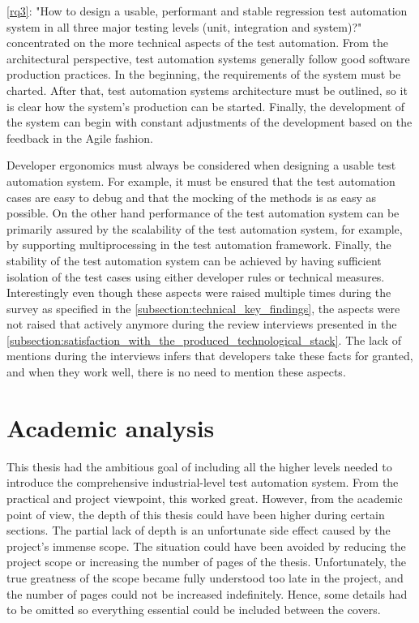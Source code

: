 \autoref{rq3}: "How to design a usable, performant and stable regression test automation system in all three major testing levels (unit, integration and system)?" concentrated on the more technical aspects of the test automation. From the architectural perspective, test automation systems generally follow good software production practices. In the beginning, the requirements of the system must be charted. After that, test automation systems architecture must be outlined, so it is clear how the system's production can be started. Finally, the development of the system can begin with constant adjustments of the development based on the feedback in the Agile fashion.

Developer ergonomics must always be considered when designing a usable test automation system. For example, it must be ensured that the test automation cases are easy to debug and that the mocking of the methods is as easy as possible. On the other hand performance of the test automation system can be primarily assured by the scalability of the test automation system, for example, by supporting multiprocessing in the test automation framework. Finally, the stability of the test automation system can be achieved by having sufficient isolation of the test cases using either developer rules or technical measures. Interestingly even though these aspects were raised multiple times during the survey as specified in the \autoref{subsection:technical_key_findings}, the aspects were not raised that actively anymore during the review interviews presented in the \autoref{subsection:satisfaction_with_the_produced_technological_stack}. The lack of mentions during the interviews infers that developers take these facts for granted, and when they work well, there is no need to mention these aspects.

\section{Academic analysis}
This thesis had the ambitious goal of including all the higher levels needed to introduce the comprehensive industrial-level test automation system. From the practical and project viewpoint, this worked great. However, from the academic point of view, the depth of this thesis could have been higher during certain sections. The partial lack of depth is an unfortunate side effect caused by the project's immense scope. The situation could have been avoided by reducing the project scope or increasing the number of pages of the thesis. Unfortunately, the true greatness of the scope became fully understood too late in the project, and the number of pages could not be increased indefinitely. Hence, some details had to be omitted so everything essential could be included between the covers.

